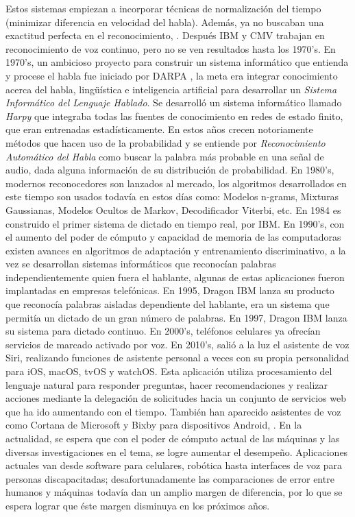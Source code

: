 \par
Estos sistemas empiezan a incorporar técnicas de normalización del tiempo (minimizar diferencia en velocidad del habla). Además, ya no buscaban una exactitud perfecta en el reconocimiento, \citep{manfred}. Después IBM y CMV trabajan en reconocimiento de voz continuo, pero no se ven resultados hasta los 1970’s.
\vskip 0.5cm
En 1970’s, un ambicioso proyecto para construir un sistema informático que entienda y procese el habla fue iniciado por DARPA \citep{frederick}, la meta era integrar conocimiento acerca del habla, lingüística e inteligencia artificial para desarrollar un \textit{Sistema Informático del Lenguaje Hablado}. Se desarrolló un sistema informático llamado \textit{Harpy} que integraba todas las fuentes de conocimiento en redes de estado finito, que eran entrenadas estadísticamente. En estos años crecen notoriamente métodos que hacen uso de la probabilidad y se entiende por \textit{Reconocimiento Automático del Habla} como buscar la palabra más probable en una señal de audio, dada alguna información de su distribución de probabilidad.
\vskip 0.5cm
En 1980’s, modernos reconocedores son lanzados al mercado, los algoritmos desarrollados en este tiempo son usados todavía en estos días como: Modelos n-grams, Mixturas Gaussianas, Modelos Ocultos de Markov, Decodificador Viterbi, etc. En 1984 es construido el primer sistema de dictado en tiempo real, por IBM.
\vskip 0.5cm
En 1990’s, con el aumento del poder de cómputo y capacidad de memoria de las computadoras existen avances en algoritmos de adaptación y entrenamiento discriminativo, a la vez se desarrollan sistemas informáticos que reconocían palabras independientemente quien fuera el hablante, algunas de estas aplicaciones fueron implantadas en empresas telefónicas. En 1995, Dragon IBM lanza su producto que reconocía palabras aisladas dependiente del hablante, era un sistema que permitía un dictado de un gran número de palabras. En 1997, Dragon IBM lanza su sistema para dictado continuo. En 2000’s, teléfonos celulares ya ofrecían servicios de marcado activado por voz.
\vskip 0.5cm
En 2010’s, salió a la luz el asistente de voz Siri, realizando funciones de asistente personal a veces con su propia personalidad para iOS, macOS, tvOS y watchOS. Esta aplicación utiliza procesamiento del lenguaje natural para responder preguntas, hacer recomendaciones y realizar acciones mediante la delegación de solicitudes hacia un conjunto de servicios web que ha ido aumentando con el tiempo. También han aparecido asistentes de voz como Cortana de Microsoft y Bixby para dispositivos Android, \citep{timetoast2010}.
\vskip 0.5cm
En la actualidad, se espera que con el poder de cómputo actual de las máquinas y las diversas investigaciones en el tema, se logre aumentar el desempeño. Aplicaciones actuales van desde software para celulares, robótica hasta interfaces de voz para personas discapacitadas; desafortunadamente las comparaciones de error entre humanos y máquinas todavía dan un amplio margen de diferencia, por lo que se espera lograr que éste margen disminuya en los próximos años.

